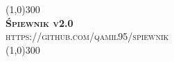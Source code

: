 
\begin{titlepage}
    \begin{center}
        \line(1,0){300}\\
        [0.5cm]
        \textsc{\huge{\bfseries Śpiewnik v2.0}}\\
        \textsc{\large https://github.com/qamil95/spiewnik}\\
        [0.3cm]
        \line(1,0){300}\\
    \end{center}
    \clearpage
\end{titlepage}